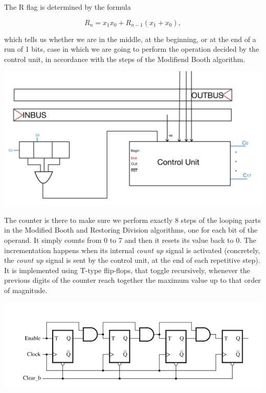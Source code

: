 \documentclass[12pt, letterpaper]{article}
\begin{document}
The R flag is determined by the formula

\[ R_n = x_1x_0 + R_{n - 1}(x_1 + x_0), \]

which tells us whether we are in the middle, at the beginning, or at the end of a run of 1 bits, case in which we are going to perform the operation
decided by the control unit, in accordance with the steps of the Modifiend Booth algorithm.

\begin{center}
\includegraphics[scale=0.3]{Documentation/ALU3}
\end{center}

The counter is there to make sure we perform exactly 8 steps of the looping parts in the Modified Booth and Restoring Division algorithms, one for each bit
of the operand. It simply counts from 0 to 7 and then it resets its value back to 0. The incrementation happens when its internal \textit{count up} signal
is activated (concretely, the \textit{count up} signal is sent by the control unit, at the end of each repetitive step). It is implemented using
T-type flip-flops, that toggle recursively, whenever the previous digits of the counter reach together the maximum value up to that order of
magnitude.\\

\begin{center}
\includegraphics[scale=0.6]{Documentation/counter}
\end{center}
\end{document}
